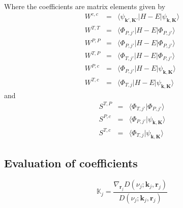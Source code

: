 \documentclass[english,oneside]{book}
\begin{document}
\noindent Where the coefficients are matrix elements given by
\begin{eqnarray}
W^{c,c} &=& \langle
\psi_{\mathbf{k}',\mathbf{K}'}|H-E|\psi_{\mathbf{k},\mathbf{K}} \rangle
 \\
W^{T,T} &=& \langle \Phi_{P,j'}|H-E|\Phi_{P,j'} \rangle
 \\
W^{P,P} &=& \langle \Phi_{P,j'}|H-E|\Phi_{P,j'} \rangle
 \\
W^{T,P} &=& \langle \Phi_{T,j'}|H-E|\Phi_{P,j'} \rangle
 \\
W^{P,c} &=& \langle \Phi_{P,j'}|H-E|\psi_{\mathbf{k},\mathbf{K}}
\rangle
 \\
W^{T,c} &=& \langle \Phi_{T,j}|H-E|\psi_{\mathbf{k},\mathbf{K}} \rangle
 \end{eqnarray}
%
and
%
\begin{eqnarray}
S^{T,P} &=& \langle \Phi_{T,j'}|\Phi_{P,j'} \rangle
 \\
S^{P,c} &=& \langle \Phi_{P,j'}|\psi_{\mathbf{k},\mathbf{K}} \rangle
 \\
S^{T,c} &=& \langle \Phi_{T,j}|\psi_{\mathbf{k},\mathbf{K}} \rangle
\end{eqnarray}

\subsection{Evaluation of coefficients}
\[
\mathbb{K}_{j} = \frac{\nabla_{\mathbf{r}_{j}}
D(\nu_{j};\mathbf{k}_{j},\mathbf{r}_{j})}{D(\nu_{j};\mathbf{k}_{j},\mathbf{r}_{j})}
\]
\end{document}

